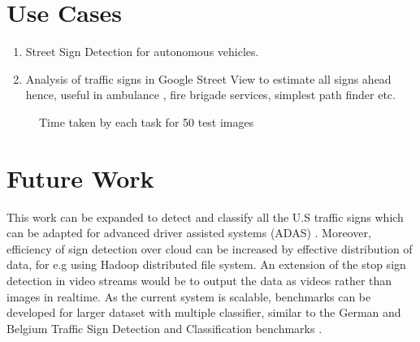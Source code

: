 \documentclass[9pt,twocolumn,twoside]{../../styles/osajnl}
\begin{document}
\section{Use Cases}
\begin{enumerate}
\item Street Sign Detection for autonomous vehicles.
\item Analysis of traffic signs in Google Street View to estimate all
  signs ahead hence, useful in ambulance , fire brigade services,
  simplest path finder etc.
\end{enumerate}
\begin{figure}[htbp]
\centering
{}
\caption{Time taken by each task for 50 test images}
\label{fig:jmedium6}
\end{figure}

\section{Future Work}
This work can be expanded to detect and classify all the U.S traffic
signs which can be adapted for advanced driver assisted systems (ADAS)
. Moreover, efficiency of sign detection over cloud can be increased
by effective distribution of data, for e.g using Hadoop distributed
file system. An extension of the stop sign detection in video streams
would be to output the data as videos rather than images in
realtime. As the current system is scalable, benchmarks can be
developed for larger dataset with multiple classifier, similar to the
German and Belgium Traffic Sign Detection and Classification
benchmarks \cite{paper-trafficsign}.
\end{document}
